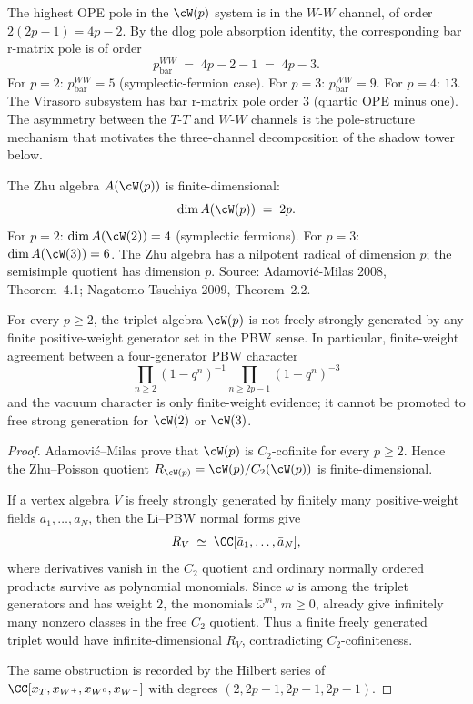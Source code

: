 \begin{remark}
\label{rem:wp-pole-order-check}
The highest OPE pole in the $\cW(p)$ system is in the $W$-$W$ channel,
of order $2(2p - 1) = 4p - 2$. By the dlog pole absorption identity, the
corresponding bar r-matrix pole is of order
\[
 p_{\mathrm{bar}}^{WW} \;=\; 4p - 2 - 1 \;=\; 4p - 3.
\]
For $p = 2$: $p_{\mathrm{bar}}^{WW} = 5$ (symplectic-fermion case).
For $p = 3$: $p_{\mathrm{bar}}^{WW} = 9$. For $p = 4$: $13$.
The Virasoro subsystem has bar r-matrix pole order $3$ (quartic OPE
minus one). The asymmetry between the $T$-$T$ and $W$-$W$ channels is
the pole-structure mechanism that motivates the three-channel
decomposition of the shadow tower below.
\end{remark}

\begin{proposition}
\label{prop:wp-zhu-finite}
The Zhu algebra $A(\cW(p))$ is finite-dimensional:
\[
 \dim A(\cW(p)) \;=\; 2 p.
\]
For $p = 2$: $\dim A(\cW(2)) = 4$ (symplectic fermions). For $p = 3$:
$\dim A(\cW(3)) = 6$. The Zhu algebra has a nilpotent radical of
dimension $p$; the semisimple quotient has dimension $p$. Source:
Adamovi\'c-Milas 2008, Theorem~4.1; Nagatomo-Tsuchiya 2009,
Theorem~2.2.
\end{proposition}

\begin{proposition}
\label{prop:wp-c2-forbids-finite-free-strong-generation}
For every $p \ge 2$, the triplet algebra $\cW(p)$ is not freely
strongly generated by any finite positive-weight generator set in the
PBW sense. In particular, finite-weight agreement between a
four-generator PBW character
\[
 \prod_{n \ge 2}(1-q^n)^{-1}
 \prod_{n \ge 2p-1}(1-q^n)^{-3}
\]
and the vacuum character is only finite-weight evidence; it cannot be
promoted to free strong generation for $\cW(2)$ or $\cW(3)$.
\end{proposition}

\begin{proof}
Adamovi\'c--Milas prove that $\cW(p)$ is $C_2$-cofinite for every
$p \ge 2$. Hence the Zhu--Poisson quotient
$R_{\cW(p)}=\cW(p)/C_2(\cW(p))$ is finite-dimensional.

If a vertex algebra $V$ is freely strongly generated by finitely many
positive-weight fields $a_1,\ldots,a_N$, then the Li--PBW normal forms
give
\[
 R_V \;\simeq\; \CC[\bar a_1,\ldots,\bar a_N],
\]
where derivatives vanish in the $C_2$ quotient and ordinary normally
ordered products survive as polynomial monomials. Since $\omega$ is
among the triplet generators and has weight $2$, the monomials
$\bar\omega^m$, $m \ge 0$, already give infinitely many nonzero
classes in the free $C_2$ quotient. Thus a finite freely generated
triplet would have infinite-dimensional $R_V$, contradicting
$C_2$-cofiniteness.

The same obstruction is recorded by the Hilbert series of
$\CC[x_T,x_{W^+},x_{W^0},x_{W^-}]$ with degrees
$(2,2p-1,2p-1,2p-1)$.
\end{proof}

